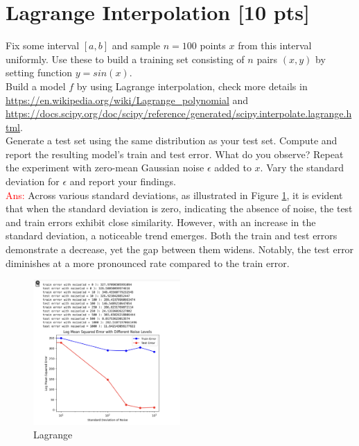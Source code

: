 \documentclass[a4paper]{article}
\theoremstyle{definition}
\newcommand{\red}[1]{\textcolor{red}{#1}}
\begin{document}
\section{Lagrange Interpolation [10 pts]}
Fix some interval $[a, b]$ and sample $n = 100$ points $x$ from this interval uniformly. Use these to build a training set consisting of $n$ pairs $(x, y)$ by setting function $y = sin(x)$. \\

Build a model $f$ by using Lagrange interpolation, check more details in \url{https://en.wikipedia.org/wiki/Lagrange_polynomial} and \url{https://docs.scipy.org/doc/scipy/reference/generated/scipy.interpolate.lagrange.html}. \\

Generate a test set using the same distribution as your test set. Compute and report the resulting model’s train and test error. What do you observe?
Repeat the experiment with zero-mean Gaussian noise $\epsilon$ added to $x$. Vary the standard deviation for $\epsilon$ and report your findings.\\
\red{Ans:}
Across various standard deviations, as illustrated in Figure \ref{fig:lagrange}, it is evident that when the standard deviation is zero, indicating the absence of noise, the test and train errors exhibit close similarity. However, with an increase in the standard deviation, a noticeable trend emerges. Both the train and test errors demonstrate a decrease, yet the gap between them widens. Notably, the test error diminishes at a more pronounced rate compared to the train error.
\begin{figure}[htbp]
  \centering
  \includegraphics[width=0.5\textwidth]{Q4.png}
  \caption{Lagrange}
  \label{fig:lagrange}
\end{figure}


\end{document}
